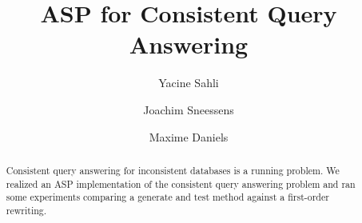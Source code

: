 \documentclass[acmsmall]{acmart}
\begin{document}
\title{ASP for Consistent Query Answering}


\author{Yacine Sahli}

\author{Joachim Sneessens}

\author{Maxime Daniels}

\renewcommand{\shortauthors}{Sahli, Sneesens and Daniels.}

\begin{abstract}
	Consistent query answering for inconsistent databases is a running problem. We realized an ASP implementation of the consistent query answering problem and ran some experiments comparing a generate and test method against a first-order rewriting.
\end{abstract}
\end{document}
